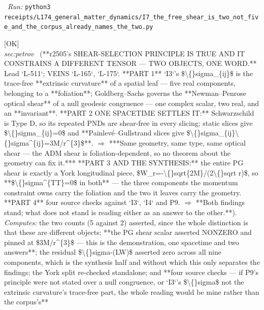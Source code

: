 \begin{description}
\ \emph{Run:} \texttt{python3 receipts/L174\_general\_matter\_dynamics/I7\_the\_free\_shear\_is\_two\_not\_five\_and\_the\_corpus\_already\_names\_the\_two.py}
\item[\label{rcpt:I6_two_objects_one_word_the_optical_shear_is_not_the_ADM_shear}\textbf{}\quad\texttt{I6\_two\_objects\_one\_word\_the\_optical\_shear\_is\_not\_the\_ADM\_shear}]\hfill\textsf{[OK]}\\
\textit{sec:petrov} \ (**r2505's SHEAR-SELECTION PRINCIPLE IS TRUE AND IT CONSTRAINS A DIFFERENT TENSOR --- TWO OBJECTS, ONE WORD.** Lead `L-511`; VEINS `L-165`, `L-175`. **PART 1** `I3`'s \$\textbackslash\{\}sigma\_\{ij\}\$ is the trace-free **extrinsic curvature** of a spatial leaf --- five real components, belonging to a **foliation**; Goldberg--Sachs governs the **Newman--Penrose optical shear** of a null geodesic congruence --- one complex scalar, two real, and an **invariant**. **PART 2 ONE SPACETIME SETTLES IT:** Schwarzschild is Type D, so its repeated PNDs are shear-free in every slicing; static slices give \$\textbackslash\{\}sigma\_\{ij\}=0\$ and **Painlevé--Gullstrand slices give \$\textbackslash\{\}sigma\_\{ij\}\textbackslash\{\}sigma\textasciicircum{}\{ij\}=3M/r\textasciicircum{}\{3\}\$**. \ensuremath{\Rightarrow} ***Same geometry, same type, same optical shear --- the ADM shear is foliation-dependent, so no theorem about the geometry can fix it.*** **PART 3 AND THE SYNTHESIS:** the entire PG shear is exactly a York longitudinal piece, \$W\_r=-\textbackslash\{\}sqrt\{2M\}/(2\textbackslash\{\}sqrt r)\$, so **\$\textbackslash\{\}sigma\textasciicircum{}\{TT\}=0\$ in both** --- the three components the momentum constraint owns carry the foliation and the two it leaves carry the geometry. **PART 4** four source checks against `I3`, `I4` and P9. \ensuremath{\Rightarrow} **Both findings stand; what does not stand is reading either as an answer to the other.**). 
\emph{Computes:} the two counts (5 against 2) asserted, since the whole distinction is that these are different objects; **the PG shear scalar asserted NONZERO and pinned at \$3M/r\textasciicircum{}\{3\}\$ --- this is the demonstration, one spacetime and two answers**; the residual \$\textbackslash\{\}sigma-(LW)\$ asserted zero across all nine components, which is the synthesis half and without which this only separates the findings; the York split re-checked standalone; and **four source checks --- if P9's principle were not stated over a null congruence, or `I3`'s \$\textbackslash\{\}sigma\$ not the extrinsic curvature's trace-free part, the whole reading would be mine rather than the corpus's**

\end{description}
